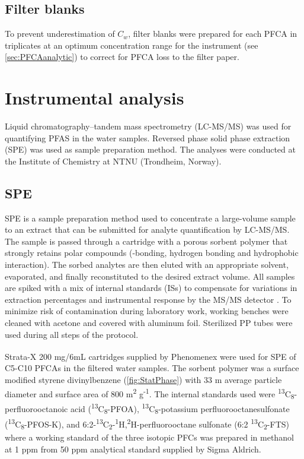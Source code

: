 \subsection{Filter blanks}
To prevent underestimation of $C_w$, filter blanks were prepared for each PFCA in triplicates at an optimum concentration range for the instrument (see \cref{sec:PFCAanalytic}) to correct for PFCA loss to the filter paper. 

\section{Instrumental analysis} \label{methods:instrAnalysis}
Liquid chromatography--tandem mass spectrometry (LC-MS/MS) was used for quantifying PFAS in the water samples. Reversed phase solid phase extraction (SPE) was used as sample preparation method. The analyses were conducted at the Institute of Chemistry at NTNU (Trondheim, Norway).

\subsection{SPE}
SPE is a sample preparation method used to concentrate a large-volume sample to an extract that can be submitted for analyte quantification by LC-MS/MS. The sample is passed through a cartridge with a porous sorbent polymer that strongly retains polar compounds (\textpi-\textpi bonding, hydrogen bonding and hydrophobic interaction). The sorbed analytes are then eluted with an appropriate solvent, evaporated, and finally reconstituted to the desired extract volume. All samples are spiked with a mix of internal standards (ISs) to compensate for variations in extraction percentages and instrumental response by the MS/MS detector \citep{arvaniti2014}. To minimize risk of contamination during laboratory work, working benches were cleaned with acetone and covered with aluminum foil. Sterilized PP tubes were used during all steps of the protocol.

Strata-X\textsuperscript{\textregistered} 200 mg/6mL cartridges supplied by Phenomenex were used for SPE of C5-C10 PFCAs in the filtered water samples. The sorbent polymer was a surface modified styrene divinylbenzene (\cref{fig:StatPhase}) with 33 \textmu m average particle diameter and surface area of 800 m\textsuperscript{2} g\textsuperscript{-1}. The internal standards used were \textsuperscript{13}C\textsubscript{8}-perfluorooctanoic acid  (\textsuperscript{13}C\textsubscript{8}-PFOA), \textsuperscript{13}C\textsubscript{8}-potassium perfluorooctanesulfonate (\textsuperscript{13}C\textsubscript{8}-PFOS-K), and 6:2-\textsuperscript{13}C\textsubscript{2}-\textsuperscript{1}H,\textsuperscript{2}H-perfluorooctane sulfonate  (6:2 \textsuperscript{13}C\textsubscript{2}-FTS) where a working standard of the three isotopic PFCs was prepared in methanol at 1 ppm from 50 ppm analytical standard supplied by Sigma Aldrich.

